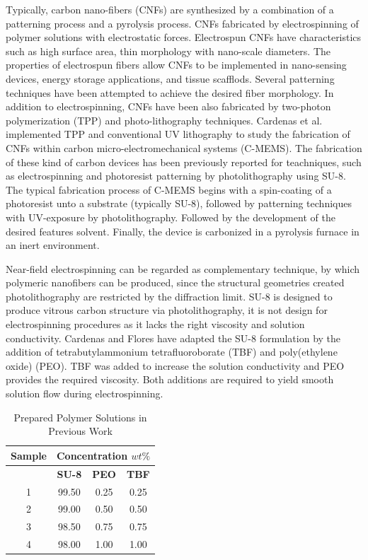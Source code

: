 Typically, carbon nano-fibers (CNFs) are synthesized by a combination of a patterning process and a pyrolysis process. CNFs fabricated by electrospinning of polymer solutions with electrostatic forces. Electrospun CNFs have characteristics such as high surface area, thin morphology with nano-scale diameters. The properties of electrospun fibers allow CNFs to be implemented in nano-sensing devices, energy storage applications, and tissue scafflods. \cite{Khanna2016, Ramakrishna2005, Reneker2000, Norris2000, Vozzi2002, Kim2003, Dersch2005} Several patterning techniques have been attempted to achieve the desired fiber morphology. In addition to electrospinning, CNFs have been also fabricated by two-photon polymerization (TPP) and photo-lithography techniques. \cite{CardenasBenitez2019} Cardenas et al. implemented TPP and conventional UV lithography to study the fabrication of CNFs within carbon micro-electromechanical systems (C-MEMS). The fabrication of these kind of carbon devices has been previously reported for teachniques, such as electrospinning and photoresist patterning by photolithography using SU-8. The typical fabrication process of C-MEMS begins with a spin-coating of a photoresist unto a substrate (typically SU-8), followed by patterning techniques with UV-exposure by photolithography. Followed by the development of the desired features solvent. Finally, the device is carbonized in a pyrolysis furnace in an inert environment. \cite{Pramanick2018a}

Near-field electrospinning can be regarded as complementary technique, by which polymeric nanofibers can be produced, since the structural geometries created photolithography are restricted by the diffraction limit. \cite{Pramanick2018a, Okazaki1991} SU-8 is designed to produce vitrous carbon structure via photolithography, it is not design for electrospinning procedures as it lacks the right viscosity and solution conductivity. Cardenas \cite{Cardenas2017} and Flores \cite{Flores2017} have adapted the SU-8 formulation by the addition of tetrabutylammonium tetrafluoroborate (TBF) and poly(ethylene oxide) (PEO). TBF was added to increase the solution conductivity and PEO provides the required viscosity. Both additions are required to yield smooth solution flow during electrospinning.

\begin{table}[ht]
\centering
\caption[Prepared Polymer Solutions in Previous Work]{Prepared Polymer Solutions in Previous Work \cite{Cardenas2017, Flores2017}}
\begin{tabular}{cccc}
\hline
\textbf{Sample} & \multicolumn{3}{c}{\textbf{Concentration} $wt\%$} \\
\hline
{} & \textbf{SU-8} & \textbf{PEO} & \textbf{TBF} \\
1 & 99.50 & 0.25 & 0.25 \\
2 & 99.00 & 0.50 & 0.50 \\
3 & 98.50 & 0.75 & 0.75 \\
4 & 98.00 & 1.00 & 1.00 \\
\hline
\end{tabular}
\label{tab:previousPreparedPolymerSolutions}
\end{table}

